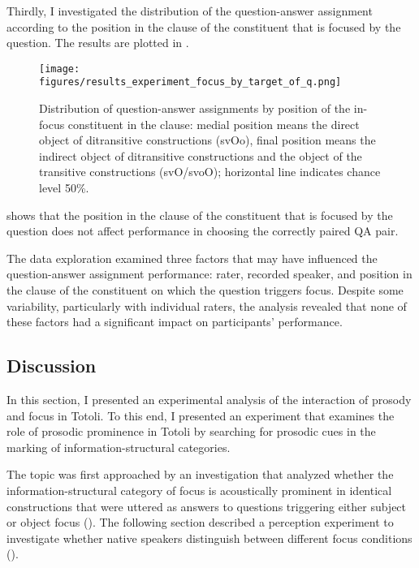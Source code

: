 




Thirdly, I investigated the distribution of the question-answer assignment according to the position in the clause of the constituent that is focused by the question. The results are plotted in  	.	

\begin{figure}
	\texttt{[image: figures/results\_experiment\_focus\_by\_target\_of\_q.png]}
	\caption{Distribution of question-answer assignments by position of the in-focus constituent in the clause: medial position means the direct object of ditransitive constructions (svOo), final position means the indirect object of ditransitive constructions and the object of the transitive constructions (svO/svoO); horizontal line indicates chance level 50\%.}
	\label{Correct answers by grammatical role of focused constituent}	
\end{figure}

 shows that the position in the clause of the constituent that is focused by the question does not affect performance in choosing the correctly paired QA pair.






The data exploration examined three factors that may have influenced the question-answer assignment performance: rater, recorded speaker, and position in the clause of the constituent on which the question triggers focus. Despite some variability, particularly with individual raters, the analysis revealed that none of these factors had a significant impact on participants' performance.


\subsection{Discussion}
\label{sec:conclusion}
In this section, I presented an experimental analysis of the interaction of prosody and focus in Totoli. To this end, I presented an experiment that  examines the role of prosodic prominence in Totoli by searching for prosodic cues in the marking of information-structural categories. 

The topic was first approached  by an investigation that analyzed whether the information-structural category of focus is acoustically prominent in identical constructions that were uttered as answers to questions triggering either subject or object focus (). The following section described a perception experiment to investigate whether native speakers distinguish between different focus conditions ().

